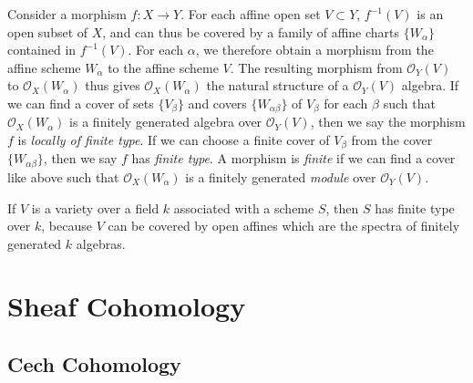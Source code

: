 Consider a morphism $f: X \to Y$. For each affine open set $V \subset Y$, $f^{-1}(V)$ is an open subset of $X$, and can thus be covered by a family of affine charts $\{ W_\alpha \}$ contained in $f^{-1}(V)$. For each $\alpha$, we therefore obtain a morphism from the affine scheme $W_\alpha$ to the affine scheme $V$. The resulting morphism from $\mathcal{O}_Y(V)$ to $\mathcal{O}_X(W_\alpha)$ thus gives $\mathcal{O}_X(W_\alpha)$ the natural structure of a $\mathcal{O}_Y(V)$ algebra. If we can find a cover of sets $\{ V_\beta \}$ and covers $\{ W_{\alpha \beta} \}$ of $V_\beta$ for each $\beta$ such that $\mathcal{O}_X(W_\alpha)$ is a finitely generated algebra over $\mathcal{O}_Y(V)$, then we say the morphism $f$ is \emph{locally of finite type}. If we can choose a finite cover of $V_\beta$ from the cover $\{ W_{\alpha \beta} \}$, then we say $f$ has \emph{finite type}. A morphism is \emph{finite} if we can find a cover like above such that $\mathcal{O}_X(W_\alpha)$ is a finitely generated \emph{module} over $\mathcal{O}_Y(V)$.

\begin{example}
    If $V$ is a variety over a field $k$ associated with a scheme $S$, then $S$ has finite type over $k$, because $V$ can be covered by open affines which are the spectra of finitely generated $k$ algebras.
\end{example}













\chapter{Sheaf Cohomology}

\section{Cech Cohomology}

